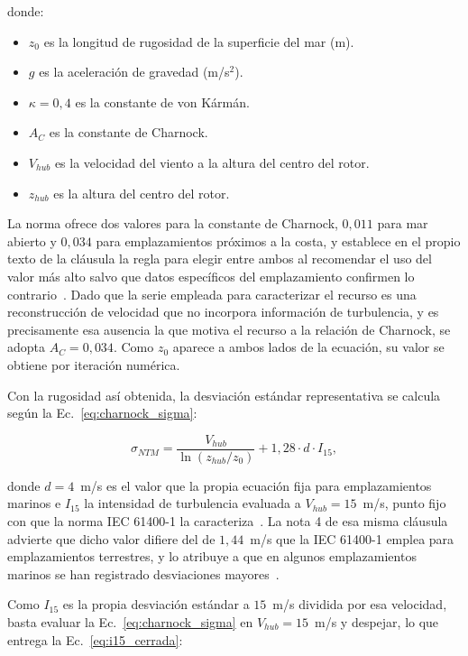 donde:
\begin{itemize}
    \item $z_0$ es la longitud de rugosidad de la superficie del mar (m).
    \item $g$ es la aceleración de gravedad (m/s$^2$).
    \item $\kappa = 0{,}4$ es la constante de von Kármán.
    \item $A_C$ es la constante de Charnock.
    \item $V_{hub}$ es la velocidad del viento a la altura del centro del rotor.
    \item $z_{hub}$ es la altura del centro del rotor.
\end{itemize}

La norma ofrece dos valores para la constante de Charnock, $0{,}011$ para mar abierto y $0{,}034$ para emplazamientos próximos a la costa, y establece en el propio texto de la cláusula la regla para elegir entre ambos al recomendar el uso del valor más alto salvo que datos específicos del emplazamiento confirmen lo contrario~\parencite{IEC61400-3-2}. Dado que la serie empleada para caracterizar el recurso es una reconstrucción de velocidad que no incorpora información de turbulencia, y es precisamente esa ausencia la que motiva el recurso a la relación de Charnock, se adopta $A_C = 0{,}034$. Como $z_0$ aparece a ambos lados de la ecuación, su valor se obtiene por iteración numérica.

Con la rugosidad así obtenida, la desviación estándar representativa se calcula según la Ec.~\ref{eq:charnock_sigma}:

\begin{equation}
    \sigma_{NTM} = \frac{V_{hub}}{\ln \left( z_{hub} / z_0 \right)} + 1{,}28 \cdot d \cdot I_{15},
    \label{eq:charnock_sigma}
\end{equation}

donde $d = 4$~m/s es el valor que la propia ecuación fija para emplazamientos marinos e $I_{15}$ la intensidad de turbulencia evaluada a $V_{hub} = 15$~m/s, punto fijo con que la norma IEC 61400-1 la caracteriza~\parencite*{IEC61400-1}. La nota 4 de esa misma cláusula advierte que dicho valor difiere del de $1{,}44$~m/s que la IEC 61400-1 emplea para emplazamientos terrestres, y lo atribuye a que en algunos emplazamientos marinos se han registrado desviaciones mayores~\parencite{IEC61400-3-2}.

Como $I_{15}$ es la propia desviación estándar a $15$~m/s dividida por esa velocidad, basta evaluar la Ec.~\ref{eq:charnock_sigma} en $V_{hub} = 15$~m/s y despejar, lo que entrega la Ec.~\ref{eq:i15_cerrada}:


